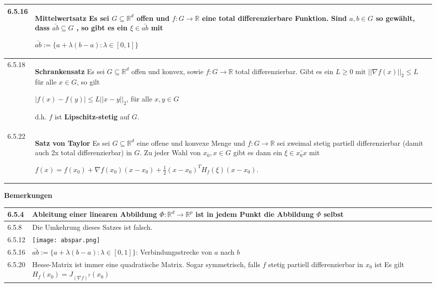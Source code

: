 \begin{table}[H]
\begin{tabularx}{\textwidth}{X m{16cm}}
        6.5.16& \textbf{Mittelwertsatz} \hfill \break
                Es sei $G \subseteq \mathbb{R}^d$ offen und $f : G \rightarrow \mathbb{R}$ eine total differenzierbare Funktion. Sind 
                $a,b \in G$ so gewählt, dass $\bar{ab} \subseteq G$ , so gibt es ein $\xi \in \bar{ab}$ mit \hfill \break
                \centerline{$\bar{ab} := \{ a + \lambda (b-a) : \lambda \in [0,1]\} $} \\
        \midrule
        6.5.18& \textbf{Schrankensatz} \hfill \break
                Es sei $G \subseteq \mathbb{R}^d$ offen und konvex, sowie $f: G \rightarrow \mathbb{R}$ total differenzierbar. Gibt es ein
                $L \geq 0$ mit $||\nabla f(x)||_2 \leq L$ für alle $x \in G$, so gilt \hfill \break
                \centerline{$ |f(x) - f(y)| \leq L||x-y||_2 $, für alle $x,y \in G$}
                d.h. $f$ ist \textbf{Lipschitz-stetig} auf $G$. \\
        \midrule
        6.5.22& \textbf{Satz von Taylor} \hfill \break
                Es sei $G \subseteq \mathbb{R}^d$ eine offene und konvexe Menge und $f: G \rightarrow \mathbb{R}$ sei zweimal
                stetig partiell differenzierbar (damit auch 2x total differenzierbar) in $G$. Zu jeder Wahl von
                $x_0, x \in G$ gibt es dann ein $\xi \in \bar{x_0x}$ mit \hfill \break
                \centerline{$ f(x) = f(x_0) + \nabla f(x_0)(x-x_0) + \frac{1}{2} (x-x_0)^T H_f(\xi)(x-x_0)$.} \\

        \bottomrule
    \end{tabularx}
    \end{table}

    \noindent
    \textbf{Bemerkungen}
    \begin{table}[H]
    \begin{tabularx}{\textwidth}{X m{16cm}}
        \toprule

        6.5.4 & Ableitung einer linearen Abbildung $\Phi: \mathbb{R}^d \rightarrow \mathbb{R}^p$ ist in jedem Punkt die Abbildung $\Phi$ selbst \\
        \midrule
        6.5.8 & Die Umkehrung dieses Satzes ist falsch. \\
        \midrule
        6.5.12& \texttt{[image: abspar.png]} \\
        \midrule
        6.5.16& $\bar{ab} := \{a+\lambda(b-a):\lambda \in [0,1]\}$: Verbindungsstrecke von $a$ nach $b$ \\
        \midrule
        6.5.20& Hesse-Matrix ist immer eine quadratische Matrix. \hfill \break
                Sogar symmetrisch, falls $f$ stetig partiell differenzierbar in $x_0$ ist \hfill \break
                Es gilt $H_f(x_0) = J_{(\nabla f)^T}(x_0)$  \\

        \bottomrule
    \end{tabularx}
    \end{table}


